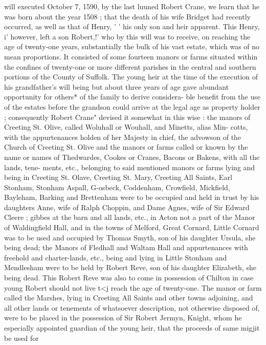 \documentclass[oneside]{book}
\begin{document}
will executed October 7, 1590, by the last luuned Robert Crane, 
we learn that he was born about the year 1508 ; that the death of 
his wife Bridget had recently occurred, as well as that of Henry, ' ' 
his only son and heir apparent. This Henry, i' however, left a 
son Robert,!' who by this will was to receive, on reaching the age 
of twenty-one years, substantially the bulk of his vast estate, 
which was of no mean proportions. It consisted of some fourteen 
manors or farms situated within the confines of twenty-one or 
more different parishes in the central and southern portions of the 
County of Suffolk. The young heir at the time of the execution 
of his grandfather's will being but about three years of age gave 
abundant opportunity for others* of the family to derive considera- 
ble benefit from the use of the estates before the grandson could 
arrive at the legal age as property holder ; consequently Robert 
Crane" devised it somewhat in this wise : the manors of Creeting 
St. Olive, called Woluhall or Wouhall, and Minetts, alias Min- 
cotts, with the appurtenances holden of her Majesty in chief, the 
advowson of the Church of Creeting St. Olive and the manors or 
farms called or known by the name or names of Thedwardes, 
Cookes or Cranes, Bacons or Bakens, with all the lands, tene- 
ments, etc., belonging to said mentioned manors or farms lying 
and being in Creeting St. Olave, Creeting St. Mary, Creeting All 
Saints, Earl Stonham, Stonham Aspall, G-osbeck, Coddenham, 
Crowfield, Mickfield, Bayleham, Barking and Brettenham were to 
be occupied and held in trust by his daughters Anne, wife of 
Ralph Choppin, and Dame Agnes, wife of Sir Edward Cleere ; 
gibbes at the barn and all lands, etc., in Acton not a part of the 
Manor of Waldingfield Hall, and in the towns of Melford, Great 
Cornard, Little Cornard was to be used and occupied by Thomas 
Smyth, son of his daughter Ursula, she being dead; the Manors 
of Fledhall and Waltam Hall and appurtenances with freehold 
and charter-lands, etc., being and lying in Little Stonham and 
Mendlesham were to be held by Robert Reve, son of his daughter 
Elizabeth, she being dead. This Robert Reve was also to come 
in possession of Chilton in case young Robert should not live t<j 
reach the age of twenty-one. The manor or farm called the 
Marshes, lying in Creeting All Saints and other towns adjoining, 
and all other lands or tenements of whatsoever description, not 
otherwise disposed of, were to be placed in the possession of Sir 
Robert Jermyn, Knight, whom he especially appointed guardian 
of the young heir, that the proceeds of same migjit be used for 
\end{document}
